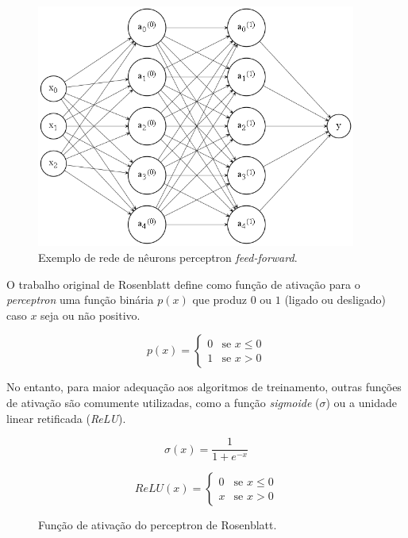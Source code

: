 \documentclass[12pt, a4paper]{article}
\begin{document}
\begin{figure}[H]
	\centering
	\includegraphics[width=\textwidth, height=8cm, keepaspectratio=true]{fig/perceptron_net}
	\caption{Exemplo de rede de nêurons perceptron \emph{feed-forward}.}
\end{figure}

O trabalho original de Rosenblatt define como função de ativação para o \emph{perceptron} uma função binária $p(x)$ que produz $0$ ou $1$ (ligado ou desligado) caso $x$ seja ou não positivo.

\begin{equation}
p(x) =
	\begin{cases}
		0 & \text{se } x \leq 0 \\
		1 & \text{se } x > 0
	\end{cases}
\end{equation}

No entanto, para maior adequação aos algoritmos de treinamento, outras funções de ativação são comumente utilizadas, como a função \emph{sigmoide} ($\sigma$) ou a unidade linear retificada (\emph{ReLU}).

\begin{equation}
\sigma(x) = \frac{1}{1 + e^{-x}}
\end{equation}

\begin{equation}
ReLU(x) =
	\begin{cases}
		0 & \text{se } x \leq 0 \\
		x & \text{se } x > 0
	\end{cases}
\end{equation}


\begin{figure}[H]
	\centering
	\caption{Função de ativação do perceptron de Rosenblatt.}
\end{figure}
\end{document}
